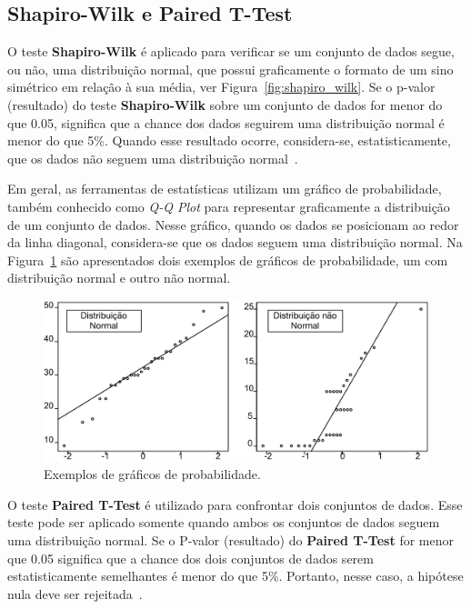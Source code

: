 \subsection{Shapiro-Wilk e Paired T-Test}

O teste \textbf{Shapiro-Wilk} é aplicado para verificar se um conjunto de dados segue, ou não, uma distribuição normal, que possui graficamente o formato de um sino simétrico em relação à sua média, ver Figura~\ref{fig:shapiro_wilk}. Se o p-valor (resultado) do teste \textbf{Shapiro-Wilk} sobre um conjunto de dados for menor do que 0.05, significa que a chance dos dados seguirem uma distribuição normal é menor do que 5\%. Quando esse resultado ocorre, considera-se, estatisticamente, que os dados não seguem uma distribuição normal~\cite{Wohlin}. 


Em geral, as ferramentas de estatísticas utilizam um gráfico de probabilidade, também conhecido como \textit{Q-Q Plot} para representar graficamente a distribuição de um conjunto de dados. Nesse gráfico, quando os dados se posicionam ao redor da linha diagonal, considera-se que os dados seguem uma distribuição normal. Na Figura~\ref{fig:qq_plot_exemple} são apresentados dois exemplos de gráficos de probabilidade, um com distribuição normal e outro não normal.

\begin{figure}[h]
	\centering
	\caption{Exemplos de gráficos de probabilidade.}
	\label{fig:qq_plot_exemple}
	\includegraphics[scale=0.7]{images/qq_plot_exemplo}
	\fautor
\end{figure}

O teste \textbf{Paired T-Test} é utilizado para confrontar dois conjuntos de dados. Esse teste pode ser aplicado somente quando ambos os conjuntos de dados seguem uma distribuição normal. Se o P-valor (resultado) do \textbf{Paired T-Test} for menor que 0.05 significa que a chance dos dois conjuntos de dados serem estatisticamente semelhantes é menor do que 5\%. Portanto, nesse caso, a hipótese nula deve ser rejeitada~\cite{Wohlin}.


